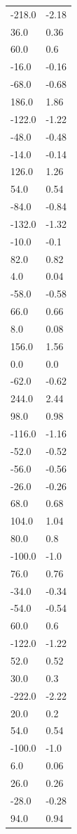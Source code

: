 \begin{longtable}{ll}
-218.0 & -2.18 \\
36.0 & 0.36 \\
60.0 & 0.6 \\
-16.0 & -0.16 \\
-68.0 & -0.68 \\
186.0 & 1.86 \\
-122.0 & -1.22 \\
-48.0 & -0.48 \\
-14.0 & -0.14 \\
126.0 & 1.26 \\
54.0 & 0.54 \\
-84.0 & -0.84 \\
-132.0 & -1.32 \\
-10.0 & -0.1 \\
82.0 & 0.82 \\
4.0 & 0.04 \\
-58.0 & -0.58 \\
66.0 & 0.66 \\
8.0 & 0.08 \\
156.0 & 1.56 \\
0.0 & 0.0 \\
-62.0 & -0.62 \\
244.0 & 2.44 \\
98.0 & 0.98 \\
-116.0 & -1.16 \\
-52.0 & -0.52 \\
-56.0 & -0.56 \\
-26.0 & -0.26 \\
68.0 & 0.68 \\
104.0 & 1.04 \\
80.0 & 0.8 \\
-100.0 & -1.0 \\
76.0 & 0.76 \\
-34.0 & -0.34 \\
-54.0 & -0.54 \\
60.0 & 0.6 \\
-122.0 & -1.22 \\
52.0 & 0.52 \\
30.0 & 0.3 \\
-222.0 & -2.22 \\
20.0 & 0.2 \\
54.0 & 0.54 \\
-100.0 & -1.0 \\
6.0 & 0.06 \\
26.0 & 0.26 \\
-28.0 & -0.28 \\
94.0 & 0.94 \\

\end{longtable}
